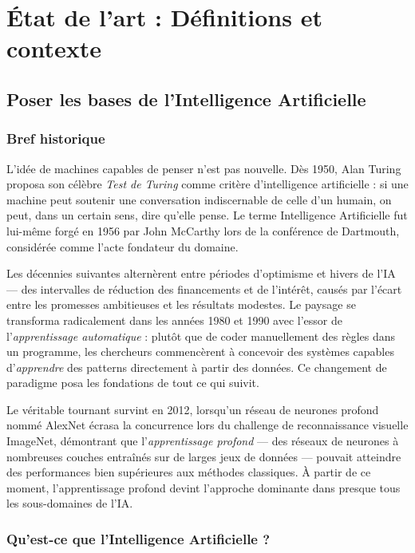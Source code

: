 \documentclass[a4paper,11pt]{article}
\begin{document}
\newpage
\section{État de l'art : Définitions et contexte}

\subsection{Poser les bases de l'Intelligence Artificielle}

\subsubsection{Bref historique}

L'idée de machines capables de penser n'est pas nouvelle. Dès 1950, Alan
Turing proposa son célèbre \emph{Test de Turing} comme critère d'intelligence
artificielle \cite{turing1950computing} : si une machine peut soutenir une
conversation indiscernable de celle d'un humain, on peut, dans un certain
sens, dire qu'elle pense. Le terme \og Intelligence Artificielle \fg{} fut
lui-même forgé en 1956 par John McCarthy lors de la conférence de Dartmouth,
considérée comme l'acte fondateur du domaine.

Les décennies suivantes alternèrent entre périodes d'optimisme et
\og hivers de l'IA \fg{} --- des intervalles de réduction des financements
et de l'intérêt, causés par l'écart entre les promesses ambitieuses et les
résultats modestes. Le paysage se transforma radicalement dans les années
1980 et 1990 avec l'essor de l'\emph{apprentissage automatique} : plutôt que
de coder manuellement des règles dans un programme, les chercheurs commencèrent
à concevoir des systèmes capables d'\emph{apprendre} des patterns directement
à partir des données. Ce changement de paradigme posa les fondations de tout
ce qui suivit.

Le véritable tournant survint en 2012, lorsqu'un réseau de neurones profond
nommé AlexNet \cite{krizhevsky2012alexnet} écrasa la concurrence lors du
challenge de reconnaissance visuelle ImageNet, démontrant que
l'\emph{apprentissage profond} --- des réseaux de neurones à nombreuses
couches entraînés sur de larges jeux de données --- pouvait atteindre des
performances bien supérieures aux méthodes classiques. À partir de ce moment,
l'apprentissage profond devint l'approche dominante dans presque tous les
sous-domaines de l'IA.

\subsubsection{Qu'est-ce que l'Intelligence Artificielle ?}
\end{document}
